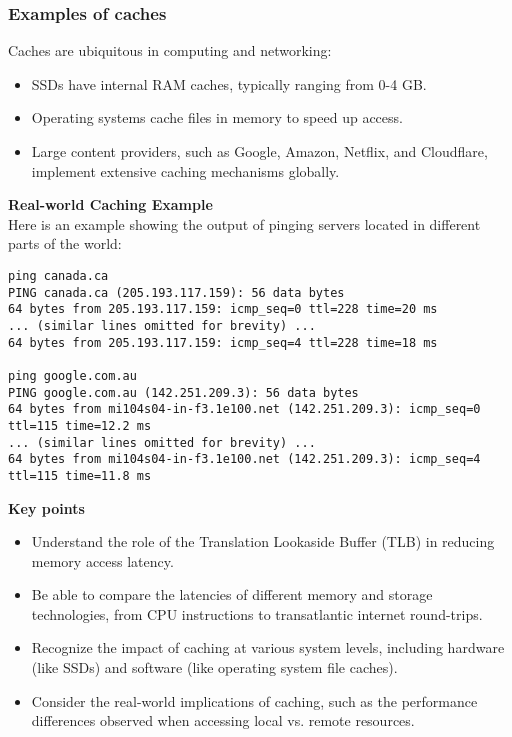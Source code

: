 \documentclass[12pt]{article}
\begin{document}
\subsubsection{Examples of caches}
Caches are ubiquitous in computing and networking:

\begin{itemize}
    \item SSDs have internal RAM caches, typically ranging from 0-4 GB.
    \item Operating systems cache files in memory to speed up access.
    \item Large content providers, such as Google, Amazon, Netflix, and Cloudflare, implement extensive caching mechanisms globally.
\end{itemize}

\textbf{Real-world Caching Example}\\
Here is an example showing the output of pinging servers located in different parts of the world:

\begin{verbatim}
ping canada.ca
PING canada.ca (205.193.117.159): 56 data bytes
64 bytes from 205.193.117.159: icmp_seq=0 ttl=228 time=20 ms
... (similar lines omitted for brevity) ...
64 bytes from 205.193.117.159: icmp_seq=4 ttl=228 time=18 ms

ping google.com.au
PING google.com.au (142.251.209.3): 56 data bytes
64 bytes from mi104s04-in-f3.1e100.net (142.251.209.3): icmp_seq=0 ttl=115 time=12.2 ms
... (similar lines omitted for brevity) ...
64 bytes from mi104s04-in-f3.1e100.net (142.251.209.3): icmp_seq=4 ttl=115 time=11.8 ms
\end{verbatim}

\textbf{Key points}
\begin{itemize}
    \item Understand the role of the Translation Lookaside Buffer (TLB) in reducing memory access latency.
    \item Be able to compare the latencies of different memory and storage technologies, from CPU instructions to transatlantic internet round-trips.
    \item Recognize the impact of caching at various system levels, including hardware (like SSDs) and software (like operating system file caches).
    \item Consider the real-world implications of caching, such as the performance differences observed when accessing local vs. remote resources.
\end{itemize}
\end{document}
